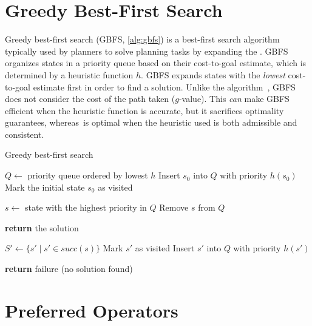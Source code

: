 \documentclass[ppgc,diss,english]{iiufrgs}
\begin{document}
\section{Greedy Best-First Search}
\label{sec:background-gbfs}
Greedy best-first search (GBFS, \cref{alg:gbfs}) is a best-first search algorithm typically used by planners to solve planning tasks by expanding the \fsp. GBFS organizes states in a priority queue based on their cost-to-goal estimate, which is determined by a heuristic function $h$. GBFS expands states with the \emph{lowest} cost-to-goal estimate first in order to find a solution. Unlike the \astar algorithm~\cite{Hart.etal/1968}, GBFS does not consider the cost of the path taken ($g$-value). This \emph{can} make GBFS efficient when the heuristic function is accurate, but it sacrifices optimality guarantees, whereas~\astar is optimal when the heuristic used is both admissible and consistent.

\begin{algorithm}[tb]
\caption{Greedy best-first search}
\label{alg:gbfs}
\begin{algorithmic}[1]
  \State $Q \gets$ priority queue ordered by lowest $h$
    \State Insert $s_0$ into $Q$ with priority $h(s_0)$
    \State Mark the initial state $s_0$ as visited
  \EndIf

    \State $s \gets$ state with the highest priority in $Q$
    \State Remove $s$ from $Q$

      \State \textbf{return} the solution
    \EndIf

    \State $S' \gets \{s' \mid s' \in succ(s)\}$
        \State Mark $s'$ as visited
        \State Insert $s'$ into $Q$ with priority $h(s')$
      \EndIf
    \EndFor
  \EndWhile

  \State \textbf{return} failure (no solution found)
\EndProcedure
\end{algorithmic}
\end{algorithm}

\section{Preferred Operators}
\label{sec:background-preferred-operators}
\end{document}
